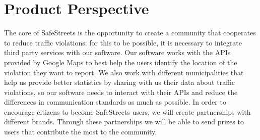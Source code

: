 \section{Product Perspective}
The core of SafeStreets is the opportunity to create a community that cooperates to reduce traffic violations: for this to be possible, it is necessary to integrate third party services with our software. 
Our software works with the APIs provided by Google Maps to best help the users identify the location of the violation they want to report.
We also work with different municipalities that help us provide better statistics by sharing with us their data about traffic violations, so our software needs to interact with their APIs and reduce the differences in communication standards as much as possible.
In order to encourage citizens to become SafeStreets users, we will create partnerships with different brands. Through these partnerships we will be able to send prizes to users that contribute the most to the community.